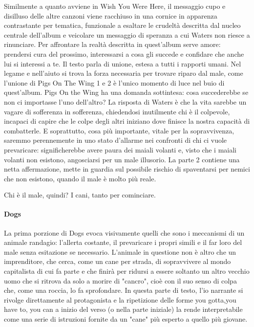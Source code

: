 \documentclass[class=book, crop=false, oneside, 12pt]{standalone}
\begin{document}
    Similmente a quanto avviene in Wish You Were Here, il messaggio cupo e disilluso delle altre canzoni viene racchiuso in una cornice in apparenza contrastante per tematica, funzionale a esaltare le crudeltà descritta dal nucleo centrale dell'album e veicolare un messaggio di speranza a cui Waters non riesce a rinunciare. Per affrontare la realtà descritta in quest'album serve amore: prendersi cura del prossimo, interessarsi a cosa gli succede e confidare che anche lui si interessi a te. Il testo parla di unione, estesa a tutti i rapporti umani. Nel legame e nell'aiuto si trova la forza necessaria per trovare riparo dal male, come l'unione di Pigs On The Wing 1 e 2 è l'unico momento di luce nel buio di quest'album. Pigs On the Wing ha una domanda sottintesa: cosa succederebbe se non ci importasse l'uno dell'altro? La risposta di Waters è che la vita sarebbe un vagare di sofferenza in sofferenza, chiedendosi inutilmente chi è il colpevole, incapaci di capire che le colpe degli altri iniziano dove finisce la nostra capacità di combatterle. E soprattutto, cosa più importante, vitale per la sopravvivenza, saremmo perennemente in uno stato d'allarme nei confronti di chi ci vuole prevaricare: significherebbe avere paura dei maiali volanti e, visto che i maiali volanti non esistono, angosciarsi per un male illusorio. La parte 2 contiene una netta affermazione, mette in guardia sul possibile rischio di spaventarsi per nemici che non esistono, quando il male è molto più reale.

    Chi è il male, quindi? I cani, tanto per cominciare.

    \paragraph{Dogs}
    La prima porzione di Dogs evoca visivamente quelli che sono i meccanismi di un animale randagio: l'allerta costante, il prevaricare i propri simili e il far loro del male senza esitazione se necessario. L'animale in questione non è altro che un imprenditore, che cerca, come un cane per strada, di sopravvivere al mondo capitalista di cui fa parte e che finirà per ridursi a essere soltanto un altro vecchio uomo che si ritrova da solo a morire di "cancro", cioè con il suo senso di colpa che, come una roccia, lo fa sprofondare. In questa parte di testo, l'io narrante si rivolge direttamente al protagonista e la ripetizione delle forme you gotta,you have to, you can a inizio del verso (o nella parte iniziale) la rende interpretabile come una serie di istruzioni fornite da un "cane" più esperto a quello più giovane.
\end{document}
